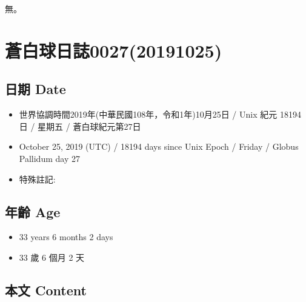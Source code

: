 \documentclass[a5paper, 12pt
]{book}
\providecommand{\tightlist}{%
  \setlength{\itemsep}{0pt}\setlength{\parskip}{0pt}}
\begin{document}
無。

\hypertarget{ux84bcux767dux7403ux65e5ux8a8c002720191025}{%
\section{蒼白球日誌0027(20191025)}\label{ux84bcux767dux7403ux65e5ux8a8c002720191025}}

\hypertarget{ux65e5ux671f-date-26}{%
\subsection{日期 Date}\label{ux65e5ux671f-date-26}}

\begin{itemize}
\tightlist
\item
  世界協調時間2019年(中華民國108年，令和1年)10月25日 / Unix 紀元 18194
  日 / 星期五 / 蒼白球紀元第27日
\item
  October 25, 2019 (UTC) / 18194 days since Unix Epoch / Friday / Globus
  Pallidum day 27
\item
  特殊註記:
\end{itemize}

\hypertarget{ux5e74ux9f61-age-26}{%
\subsection{年齡 Age}\label{ux5e74ux9f61-age-26}}

\begin{itemize}
\tightlist
\item
  33 years 6 months 2 days
\item
  33 歲 6 個月 2 天
\end{itemize}

\hypertarget{ux672cux6587-content-26}{%
\subsection{本文 Content}\label{ux672cux6587-content-26}}
\end{document}
